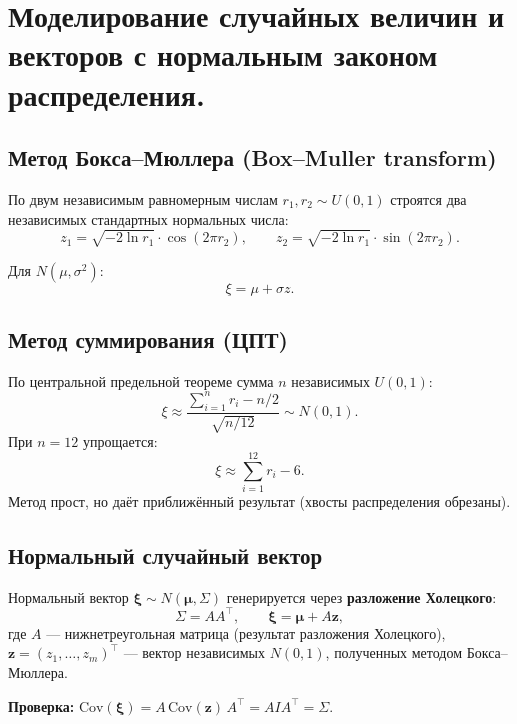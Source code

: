 \section{Моделирование случайных величин и векторов с нормальным законом распределения.}

\subsection*{Метод Бокса–Мюллера (Box–Muller transform)}

По двум независимым равномерным числам $r_1, r_2 \sim U(0,1)$ строятся два независимых стандартных нормальных числа:
\[
  z_1 = \sqrt{-2\ln r_1}\cdot\cos(2\pi r_2), \qquad
  z_2 = \sqrt{-2\ln r_1}\cdot\sin(2\pi r_2).
\]

Для $N(\mu, \sigma^2)$:
\[
  \xi = \mu + \sigma z.
\]

\subsection*{Метод суммирования (ЦПТ)}

По центральной предельной теореме сумма $n$ независимых $U(0,1)$:
\[
  \xi \approx \frac{\sum_{i=1}^n r_i - n/2}{\sqrt{n/12}} \sim N(0,1).
\]
При $n=12$ упрощается:
\[
  \xi \approx \sum_{i=1}^{12} r_i - 6.
\]
Метод прост, но даёт приближённый результат (хвосты распределения обрезаны).

\subsection*{Нормальный случайный вектор}

Нормальный вектор $\boldsymbol{\xi} \sim N(\boldsymbol{\mu}, \Sigma)$ генерируется через \textbf{разложение Холецкого}:
\[
  \Sigma = AA^\top, \qquad \boldsymbol{\xi} = \boldsymbol{\mu} + A\mathbf{z},
\]
где $A$ — нижнетреугольная матрица (результат разложения Холецкого), $\mathbf{z} = (z_1, \ldots, z_m)^\top$ — вектор независимых $N(0,1)$, полученных методом Бокса–Мюллера.

\textbf{Проверка:} $\mathrm{Cov}(\boldsymbol{\xi}) = A\,\mathrm{Cov}(\mathbf{z})\,A^\top = A I A^\top = \Sigma$. \checkmark

\clearpage
